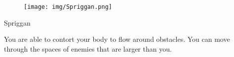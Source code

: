 \newpage

\begin{figure}[ht!]
	\texttt{[image: img/Spriggan.png]}
\end{figure}

\begin{monsterbox}{Spriggan}
	\vspace{.1in}
	\hline
	\stats[
	STR = +1,
	DEX = +1,
	VIT = -1,
	FOC = +1,
	WILL = -1
	]
	\hline
	
	\vspace{.1in}
	
	\begin{monsteraction}[Writhing]
		You are able to contort your body to flow around obstacles. You can move through the spaces of enemies that are larger than you.
	\end{monsteraction}
\end{monsterbox}